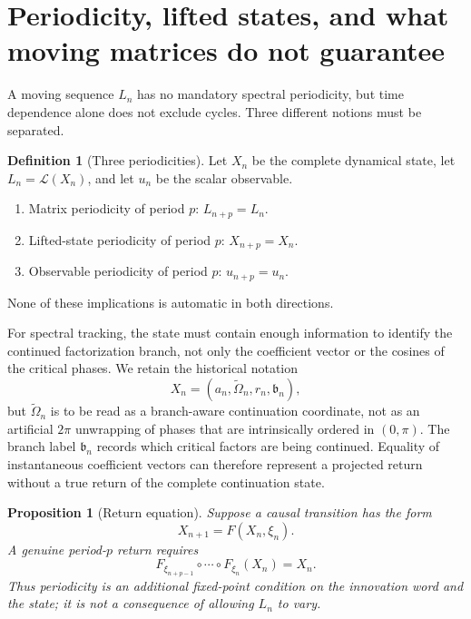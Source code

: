\documentclass[11pt]{amsart}
\numberwithin{equation}{section}
\theoremstyle{plain}
\newtheorem{proposition}[theorem]{Proposition}
\theoremstyle{definition}
\newtheorem{definition}[theorem]{Definition}
\theoremstyle{remark}
\begin{document}
\section{Periodicity, lifted states, and what moving matrices do not guarantee}
\label{sec:lifted_periodicity}

A moving sequence $L_n$ has no mandatory spectral periodicity, but time dependence alone does not
exclude cycles.  Three different notions must be separated.

\begin{definition}[Three periodicities]
\label{def:three_periodicities}
Let $X_n$ be the complete dynamical state, let $L_n=\mathcal L(X_n)$, and let $u_n$ be the scalar
observable.
\begin{enumerate}
\item Matrix periodicity of period $p$: $L_{n+p}=L_n$.
\item Lifted-state periodicity of period $p$: $X_{n+p}=X_n$.
\item Observable periodicity of period $p$: $u_{n+p}=u_n$.
\end{enumerate}
None of these implications is automatic in both directions.
\end{definition}

For spectral tracking, the state must contain enough information to identify the continued
factorization branch, not only the coefficient vector or the cosines of the critical phases.  We
retain the historical notation
\begin{equation}
X_n=
\left(
a_n,\widetilde\Omega_n,r_n,\mathfrak b_n
\right),
\label{eq:lifted_state}
\end{equation}
but $\widetilde\Omega_n$ is to be read as a branch-aware continuation coordinate, not as an
artificial $2\pi$ unwrapping of phases that are intrinsically ordered in $(0,\pi)$.  The branch
label $\mathfrak b_n$ records which critical factors are being continued.  Equality of
instantaneous coefficient vectors can therefore represent a projected return without a true
return of the complete continuation state.

\begin{proposition}[Return equation]
\label{prop:return_equation}
Suppose a causal transition has the form
\[
X_{n+1}=F(X_n,\xi_n).
\]
A genuine period-$p$ return requires
\begin{equation}
F_{\xi_{n+p-1}}\circ\cdots\circ F_{\xi_n}(X_n)=X_n.
\label{eq:p_step_return}
\end{equation}
Thus periodicity is an additional fixed-point condition on the innovation word and the state; it
is not a consequence of allowing $L_n$ to vary.
\end{proposition}
\end{document}
